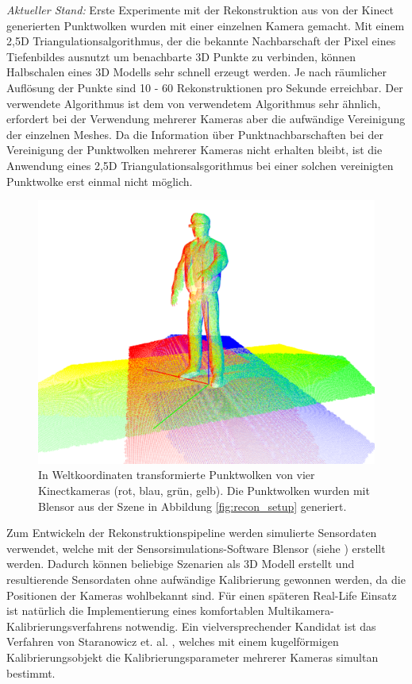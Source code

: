 {\em Aktueller Stand: } Erste Experimente mit der Rekonstruktion aus von der 
Kinect generierten Punktwolken wurden mit einer einzelnen Kamera gemacht. Mit 
einem 2,5D Triangulationsalgorithmus, der die bekannte Nachbarschaft der Pixel 
eines Tiefenbildes ausnutzt um benachbarte 3D Punkte zu verbinden, können Halbschalen 
eines 3D Modells sehr schnell erzeugt werden. Je nach räumlicher Auflösung der 
Punkte sind 10 - 60 Rekonstruktionen pro Sekunde erreichbar. Der verwendete 
Algorithmus ist dem von \cite{alexiadis2013real} verwendetem Algorithmus sehr 
ähnlich, erfordert bei der Verwendung mehrerer Kameras aber die aufwändige 
Vereinigung der einzelnen Meshes. Da die Information über Punktnachbarschaften 
bei der Vereinigung der Punktwolken mehrerer Kameras nicht erhalten bleibt, ist 
die Anwendung eines 2,5D Triangulationsalsgorithmus bei einer solchen vereinigten 
Punktwolke erst einmal nicht möglich.

\begin{figure}[H]
	\centering
	\includegraphics[width=.5\textwidth]{figs/registered_pointclouds}
	\caption{In Weltkoordinaten transformierte Punktwolken von vier 
		Kinectkameras (rot, blau, grün, gelb). Die Punktwolken wurden mit 
		Blensor \cite{Gschwandtner11b} aus der Szene in Abbildung 
		\ref{fig:recon_setup} generiert.}
	\label{fig:cloud_sources}
\end{figure}

Zum Entwickeln der Rekonstruktionspipeline werden simulierte Sensordaten 
verwendet, welche mit der Sensorsimulations-Software Blensor 
(siehe \cite{Gschwandtner11b}) erstellt werden. Dadurch können beliebige 
Szenarien als 3D Modell erstellt und resultierende Sensordaten ohne aufwändige 
Kalibrierung gewonnen werden, da die Positionen der Kameras wohlbekannt sind. 
Für einen späteren Real-Life Einsatz ist natürlich die Implementierung eines 
komfortablen Multikamera-Kalibrierungsverfahrens notwendig. Ein 
vielversprechender Kandidat ist das Verfahren von Staranowicz et. al. 
\cite{staranowicz2014easy}, welches mit einem kugelförmigen Kalibrierungsobjekt 
die Kalibrierungsparameter mehrerer Kameras simultan bestimmt.

